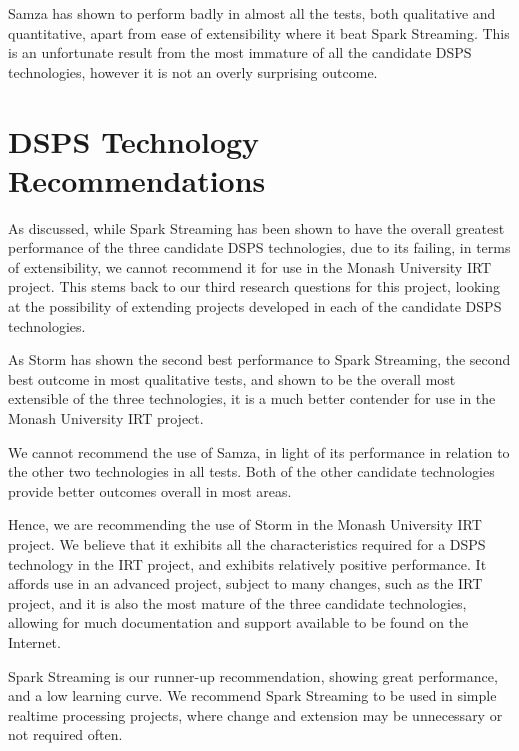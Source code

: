 Samza has shown to perform badly in almost all the tests, both qualitative and quantitative, apart from ease of extensibility where it beat Spark Streaming.
This is an unfortunate result from the most immature of all the candidate DSPS technologies, however it is not an overly
surprising outcome.



\section{DSPS Technology Recommendations} %
\label{sub:dsps_technology_recommendations}

As discussed, while Spark Streaming has been shown to have the overall greatest performance of the three candidate DSPS
technologies, due to its failing, in terms of extensibility, we cannot recommend it for use in the Monash University IRT
project. This stems back to our third research questions for this project, looking at the possibility of extending projects
developed in each of the candidate DSPS technologies.

As Storm has shown the second best performance to Spark Streaming, the second best outcome in most qualitative tests,
and shown to be the overall most extensible of the three technologies, it is a much better contender for use in the Monash
University IRT project.

We cannot recommend the use of Samza, in light of its performance in relation to the other two technologies in all tests.
Both of the other candidate technologies provide better outcomes overall in most areas.

Hence, we are recommending the use of Storm in the Monash University IRT project. We believe that it exhibits all the
characteristics required for a DSPS technology in the IRT project, and exhibits relatively positive performance. It affords
use in an advanced project, subject to many changes, such as the IRT project, and it is
also the most mature of the three candidate technologies, allowing for much documentation and support available to be found on the
Internet.

Spark Streaming is our runner-up recommendation, showing great performance, and a low learning curve. We recommend
Spark Streaming to be used in simple realtime processing projects, where change and extension may be unnecessary or not
required often.



